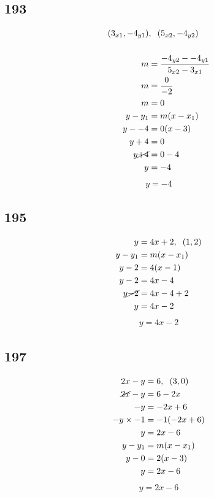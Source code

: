 \documentclass{article}
\begin{document}
    \subsection*{193}
    \begin{align*}
    (3_{x1}, -4_{y1})&,\hspace{.2cm} (5_{x2}, -4_{y2}) \\
    \\
    m &= \frac{-4_{y2} -  -4_{y1}}{5_{x2} - 3_{x1}} \\
    m &= \frac{0}{-2} \\
    m &= 0\\
    y - y_{1} &= m(x - x_{1})\\
    y - -4 &= 0(x - 3)\\
    y + 4 &= 0\\
    y \cancel{+ 4} &= 0 - 4\\
    y &= -4
    \end{align*}
    \begin{align*}
        \boxed{y  = -4}
    \end{align*}

    \subsection*{195}
    \begin{align*}
    y &= 4x +2, \hspace{.2cm}(1, 2)\\
    y - y_{1} &= m(x - x_{1})\\
    y - 2 &= 4(x - 1)\\
    y -2 &= 4x - 4\\
    y \cancel{-2} &= 4x - 4 + 2\\
    y &= 4x -2 \\
    \end{align*}
    \begin{align*}
        \boxed{ y = 4x -2}
    \end{align*}

    \subsection*{197}
    \begin{align*}
        2x -  y &= 6, \hspace{.2cm}(3, 0)\\
        \cancel{2x} - y &=6 - 2x\\
        -y &= -2x + 6 \\
        -y \times -1 &= -1(-2x + 6) \\
        y &= 2x - 6 \\
        y - y_{1} &= m(x - x_{1})\\
        y - 0 &= 2(x - 3)\\
        y &= 2x - 6\\
    \end{align*}
    \begin{align*}
        \boxed{y  = 2x - 6}
    \end{align*}
\end{document}
